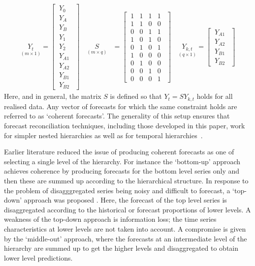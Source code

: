 \documentclass[a4paper,fleqn,11pt]{article}
\begin{document}
\begin{align*}
\underset{(m\times 1)}{Y_t} = \begin{bmatrix}
\ Y_0\ \ \\
\ Y_A\ \ \\
\ Y_B\ \ \\
\ Y_1\ \ \\
\ Y_2\ \ \\
\ Y_{A1}\ \ \\
\ Y_{A2}\ \ \\
\ Y_{B1}\ \ \\
\ Y_{B2}\ \ 
\end{bmatrix} \quad \underset{(m\times q)}{S} &=
\begin{bmatrix}
\ 1 & 1 & 1 & 1 \ \ \\
\ 1 & 1 & 0 & 0 \ \ \\
\ 0 & 0  & 1 & 1\ \ \\
\ 1 & 0 & 1 & 0 \ \ \\
\ 0 & 1 & 0 & 1\ \ \\
\ 1 & 0 & 0 & 0 \ \ \\
\ 0 & 1 & 0 & 0 \ \ \\
\ 0 & 0 & 1 & 0 \ \ \\
\ 0 & 0 & 0 & 1\ \ 
\end{bmatrix} \quad \underset{(q\times 1)}{Y_{k,t}} = \begin{bmatrix}
	\ Y_{A1}\ \ \\
	\ Y_{A2}\ \ \\
	\ Y_{B1}\ \ \\
	\ Y_{B2}\ \ 
\end{bmatrix} 
\end{align*}
Here, and in general, the matrix $S$ is defined so that $Y_t = S Y_{k,t}$ holds for all realised data.  Any vector of forecasts for which the same constraint holds are referred to as `coherent forecasts'.  The generality of this setup ensures that forecast reconciliation techniques, including those developed in this paper, work for simpler nested hierarchies as well as for temporal hierarchies~\citep{Athanasopoulos2017}.

Earlier literature reduced the issue of producing coherent forecasts as one of selecting a single level of the hierarchy.  For instance the `bottom-up' approach \citep{Gross1990} achieves coherence by producing forecasts for the bottom level series only and then these are summed up according to the hierarchical structure. In response to the problem of disagggregated series being noisy and difficult to forecast, a `top-down' approach was proposed \citep[see][and references therein]{Athanasopoulos2009}.  Here, the forecast of the top level series is disaggregated according to the historical or forecast proportions of lower levels. A weakness of the top-down approach is information loss; the time series characteristics at lower levels are not taken into account. A compromise is given by the `middle-out' approach, where the forecasts at an intermediate level of the hierarchy are summed up to get the higher levels and disaggregated to obtain lower level predictions.
\end{document}
